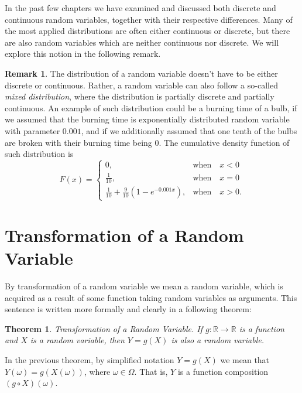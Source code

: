\documentclass[12pt,a4paper,leqno]{report}
\theoremstyle{plain}
\newtheorem{lause}[equation]{Theorem}
\theoremstyle{definition}
\newtheorem{remark}[equation]{Remark}
\begin{document}
\bigskip

In the past few chapters we have examined and discussed both discrete and continuous random variables, together with their respective differences. Many of the most applied distributions are often either continuous or discrete, but there are also random variables which are neither continuous nor discrete. We will explore this notion in the following remark.

\begin{remark}
The distribution of a random variable doesn't have to be either discrete or continuous. Rather, a random variable can also follow a so-called \emph{mixed distribution}, where the distribution is partially discrete and partially continuous. An example of such distribution could be a burning time of a bulb, if we assumed that the burning time is exponentially distributed random variable with parameter $0.001$, and if we additionally assumed that one tenth of the bulbs are broken with their burning time being $0$. The cumulative density function of such distribution is 
\[
F(x) = \begin{cases}
0, &\text{when} \quad x < 0 \\
\frac{1}{10}, & \text{when} \quad x=0  \\
\frac{1}{10} + \frac{9}{10}(1 - e^{-0.001 x}), &\text{when} \quad  x > 0. 
\end{cases}
\]
\end{remark}

\section{Transformation of a Random Variable}\label{prelim_trans}

By transformation of a random variable we mean a random variable, which is acquired as a result of some function taking random variables as arguments. This sentence is written more formally and clearly in a following theorem:

\begin{lause} \label{lause:prelim_trans}
Transformation of a Random Variable.   If $g :\mathbb{R} \rightarrow \mathbb{R}$ is a function and $X$ is a random variable, then $Y =g(X)$ is also a random variable. 
\end{lause}

In the previous theorem, by simplified notation $Y =g(X)$ we mean that $Y(\omega) = g(X(\omega))$, where $\omega \in \Omega$. That is, $Y$ is a function composition $(g \circ X) (\omega)$.
\end{document}
